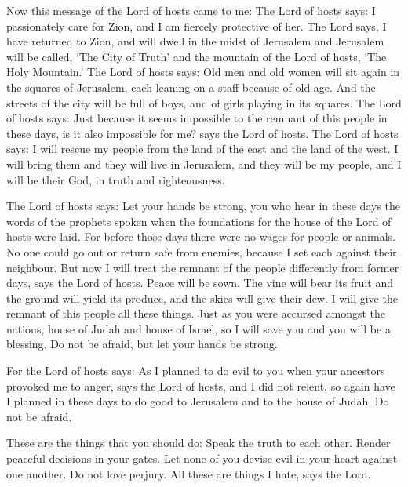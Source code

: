  Now this message of the Lord of hosts came to me:
 The Lord of hosts says: I passionately care for Zion, and I
am fiercely protective of her.  The Lord says, I have
returned to Zion, and will dwell in the midst of Jerusalem and Jerusalem
will be called, `The City of Truth' and the mountain of the Lord of
hosts, `The Holy Mountain.'  The Lord of hosts says: Old men
and old women will sit again in the squares of Jerusalem, each leaning
on a staff because of old age.  And the streets of the city
will be full of boys, and of girls playing in its squares. 
The Lord of hosts says: Just because it seems impossible to the remnant
of this people in these days, is it also impossible for me? says the
Lord of hosts.  The Lord of hosts says: I will rescue my
people from the land of the east and the land of the west. 
I will bring them and they will live in Jerusalem, and they will be my
people, and I will be their God, in truth and righteousness.

 The Lord of hosts says: Let your hands be strong, you who
hear in these days the words of the prophets spoken when the foundations
for the house of the Lord of hosts were laid.  For before
those days there were no wages for people or animals. No one could go
out or return safe from enemies, because I set each against their
neighbour.  But now I will treat the remnant of the people
differently from former days, says the Lord of hosts. 
Peace will be sown. The vine will bear its fruit and the ground will
yield its produce, and the skies will give their dew. I will give the
remnant of this people all these things.  Just as you were
accursed amongst the nations, house of Judah and house of Israel, so I
will save you and you will be a blessing. Do not be afraid, but let your
hands be strong.

 For the Lord of hosts says: As I planned to do evil to you
when your ancestors provoked me to anger, says the Lord of hosts, and I
did not relent,  so again have I planned in these days to
do good to Jerusalem and to the house of Judah. Do not be afraid.

 These are the things that you should do: Speak the truth
to each other. Render peaceful decisions in your gates. 
Let none of you devise evil in your heart against one another. Do not
love perjury. All these are things I hate, says the Lord.

